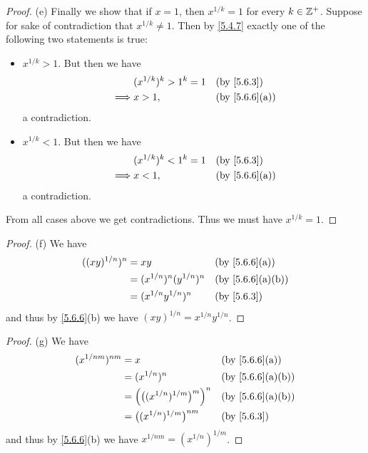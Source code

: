 \begin{proof}{(e)}
  Finally we show that if \(x = 1\), then \(x^{1 / k} = 1\) for every \(k \in \mathbb{Z}^+\).
  Suppose for sake of contradiction that \(x^{1 / k} \neq 1\).
  Then by \cref{5.4.7} exactly one of the following two statements is true:
  \begin{itemize}
    \item \(x^{1 / k} > 1\).
          But then we have
          \begin{align*}
                     & (x^{1 / k})^k > 1^k = 1 &  & \text{(by \cref{5.6.3})}    \\
            \implies & x > 1,                  &  & \text{(by \cref{5.6.6}(a))}
          \end{align*}
          a contradiction.
    \item \(x^{1 / k} < 1\).
          But then we have
          \begin{align*}
                     & (x^{1 / k})^k < 1^k = 1 &  & \text{(by \cref{5.6.3})}    \\
            \implies & x < 1,                  &  & \text{(by \cref{5.6.6}(a))}
          \end{align*}
          a contradiction.
  \end{itemize}
  From all cases above we get contradictions.
  Thus we must have \(x^{1 / k} = 1\).
\end{proof}

\begin{proof}{(f)}
  We have
  \begin{align*}
    ((xy)^{1 / n})^n & = xy                          &  & \text{(by \cref{5.6.6}(a))}    \\
                     & = (x^{1 / n})^n (y^{1 / n})^n &  & \text{(by \cref{5.6.6}(a)(b))} \\
                     & = (x^{1 / n} y^{1 / n})^n     &  & \text{(by \cref{5.6.3})}
  \end{align*}
  and thus by \cref{5.6.6}(b) we have \((xy)^{1 / n} = x^{1 / n} y^{1 / n}\).
\end{proof}

\begin{proof}{(g)}
  We have
  \begin{align*}
    (x^{1 / nm})^{nm} & = x                                           &  & \text{(by \cref{5.6.6}(a))}    \\
                      & = (x^{1 / n})^n                               &  & \text{(by \cref{5.6.6}(a)(b))} \\
                      & = \Big(\big((x^{1 / n})^{1 / m}\big)^m\Big)^n &  & \text{(by \cref{5.6.6}(a)(b))} \\
                      & = \big((x^{1 / n})^{1 / m}\big)^{nm}          &  & \text{(by \cref{5.6.3})}
  \end{align*}
  and thus by \cref{5.6.6}(b) we have \(x^{1 / nm} = (x^{1 / n})^{1 / m}\).
\end{proof}

